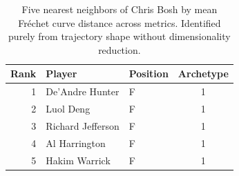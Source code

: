 \begin{table}[htbp]
  \centering\small
  \begin{tabular}{rllc}
    \toprule
    Rank & Player & Position & Archetype \\
    \midrule
    1 & De'Andre Hunter & F & 1 \\
    2 & Luol Deng & F & 1 \\
    3 & Richard Jefferson & F & 1 \\
    4 & Al Harrington & F & 1 \\
    5 & Hakim Warrick & F & 1 \\
    \bottomrule
  \end{tabular}
  \caption{Five nearest neighbors of Chris Bosh by mean Fr\'{e}chet curve distance across metrics. Identified purely from trajectory shape without dimensionality reduction.}
  \label{tab:Chris_Bosh_frechet_curve_neighbors}
\end{table}

